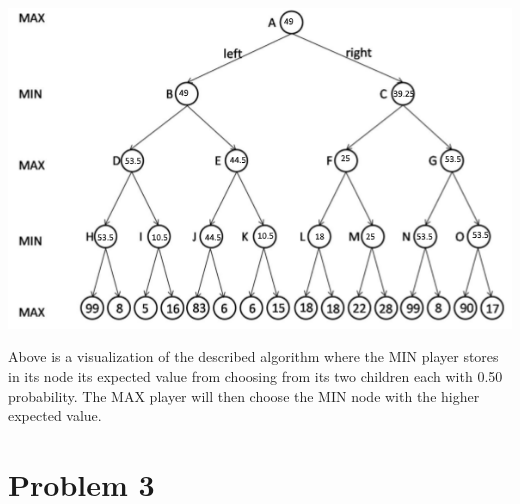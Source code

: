 \documentclass[10pt,a4paper]{article}
\begin{document}
\begin{enumerate}[A.]
		\begin{center}
			\includegraphics[scale=0.75]{random_minimax}
		\end{center}
		
		Above is a visualization of the described algorithm where the MIN player stores in its node its expected value from choosing from its two children each with 0.50 probability. The MAX player will then choose the MIN node with the higher expected value.
		
	\end{enumerate}


	\section*{Problem 3}
\end{document}
